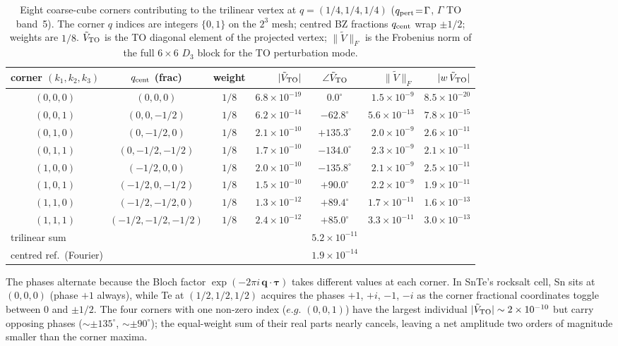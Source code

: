 \documentclass[11pt,a4paper]{article}
\begin{document}
\begin{table}[tb]
\centering
\caption{Eight coarse-cube corners contributing to the trilinear vertex at
$q=(1/4,1/4,1/4)$ ($q_{\rm pert}\!=\!\Gamma$, $\Gamma$ TO band~5).
The corner $q$ indices are integers $\{0,1\}$ on the $2^3$ mesh; centred
BZ fractions $q_{\rm cent}$ wrap $\pm1/2$; weights are $1/8$.
$\tilde V_{\rm TO}$ is the TO diagonal element of the projected vertex;
$\|\tilde V\|_F$ is the Frobenius norm of the full $6\times6$ $D_3$ block
for the TO perturbation mode.}
\label{tab:phasecorners}
\small
\begin{tabular}{cccrcrr}
\toprule
corner $(k_1,k_2,k_3)$ & $q_{\rm cent}$ (frac) & weight &
$|\tilde V_{\rm TO}|$ & $\angle\tilde V_{\rm TO}$ &
$\|\tilde V\|_F$ & $|w\,\tilde V_{\rm TO}|$ \\
\midrule
$(0,0,0)$ & $(0,0,0)$      & $1/8$ & $6.8\times10^{-19}$ &     $0.0^\circ$ & $1.5\times10^{-9}$ & $8.5\times10^{-20}$ \\
$(0,0,1)$ & $(0,0,-1/2)$   & $1/8$ & $6.2\times10^{-14}$ &  $-62.8^\circ$ & $5.6\times10^{-13}$ & $7.8\times10^{-15}$ \\
$(0,1,0)$ & $(0,-1/2,0)$   & $1/8$ & $2.1\times10^{-10}$ & $+135.3^\circ$ & $2.0\times10^{-9}$  & $2.6\times10^{-11}$ \\
$(0,1,1)$ & $(0,-1/2,-1/2)$& $1/8$ & $1.7\times10^{-10}$ & $-134.0^\circ$ & $2.3\times10^{-9}$  & $2.1\times10^{-11}$ \\
$(1,0,0)$ & $(-1/2,0,0)$   & $1/8$ & $2.0\times10^{-10}$ & $-135.8^\circ$ & $2.1\times10^{-9}$  & $2.5\times10^{-11}$ \\
$(1,0,1)$ & $(-1/2,0,-1/2)$& $1/8$ & $1.5\times10^{-10}$ &  $+90.0^\circ$ & $2.2\times10^{-9}$  & $1.9\times10^{-11}$ \\
$(1,1,0)$ & $(-1/2,-1/2,0)$& $1/8$ & $1.3\times10^{-12}$ &  $+89.4^\circ$ & $1.7\times10^{-11}$ & $1.6\times10^{-13}$ \\
$(1,1,1)$ & $(-1/2,-1/2,-1/2)$&$1/8$ & $2.4\times10^{-12}$&  $+85.0^\circ$ & $3.3\times10^{-11}$ & $3.0\times10^{-13}$ \\
\bottomrule
\multicolumn{4}{l}{trilinear sum} & $5.2\times10^{-11}$ & \\
\multicolumn{4}{l}{centred ref.\ (Fourier)} & $1.9\times10^{-14}$ & \\
\bottomrule
\end{tabular}
\end{table}

The phases alternate because the Bloch factor $\exp(-2\pi
i\,\mathbf q\cdot\boldsymbol\tau)$ takes different values at each corner.
In SnTe's rocksalt cell, Sn sits at $(0,0,0)$ (phase $+1$ always), while
Te at $(1/2,1/2,1/2)$ acquires the phases $+1$, $+i$, $-1$, $-i$ as the
corner fractional coordinates toggle between $0$ and $\pm1/2$.
The four corners with one non-zero index ($e.g.$ $(0,0,1)$) have the
largest individual $|\tilde V_{\rm TO}| \sim 2\times10^{-10}$ but carry
opposing phases ($\sim\pm135^\circ$, $\sim\pm90^\circ$); the equal-weight
sum of their real parts nearly cancels, leaving a net amplitude two
orders of magnitude smaller than the corner maxima.
\end{document}
